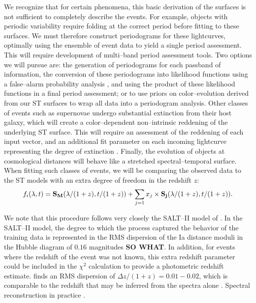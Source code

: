  We recognize that for certain
phenomena, this basic derivation of the surfaces is not sufficient to completely
describe the events. For example, objects with periodic variability require
folding at the correct period before fitting to these surfaces.  We must
therefore construct periodograms for these lightcurves, optimally using the
ensemble of event data to yield a single period assessment.  This will require
development of multi--band period assessment tools.  Two options we will pursue
are: the generation of periodograms for each passband of information, the
conversion of these periodograms into likelihood functions using a false--alarm
probability analysis \citep[e.g.][and references therein]{2009A&A...496..577Z},
and using the product of these likelihood functions in a final period
assessment; or to use priors on color--evolution derived from our ST surfaces to
wrap all data into a periodogram analysis.  Other classes of events such as
supernovae undergo substantial extinction from their host galaxy, which will
create a color--dependent non--intrinsic reddening of the underlying ST surface.
This will require an assessment of the reddening of each input vector, and an
additional fit parameter on each incoming lightcurve representing the degree of
extinction \cite[e.g. Equation 1,][]{2007A&A...466...11G}.  Finally, the
evolution of objects at cosmological distances will behave like a stretched
spectral--temporal surface.  When fitting such classes of events, we will be
comparing the observed data to the ST models with an extra degree of freedom in
the redshift $z$: $$f_i(\lambda, t) = {\bf S_M}(\lambda/(1 + z), t/(1 + z)) +
\sum_{j=1} x_j \times {\bf S_j}(\lambda/(1 + z), t/(1 + z)).$$

 We note that this procedure follows very closely
the SALT--II model of \cite{2007A&A...466...11G}.  In the SALT--II model, the
degree to which the process captured the behavior of the training data is
represented in the RMS dispersion of the Ia distance moduli in the Hubble
diagram of $0.16$ magnitudes {\bf SO WHAT}.  In addition, for events where the
redshift of the event was not known, this extra redshift parameter could be
included in the $\chi^2$ calculation to provide a photometric redshift estimate.
\cite{2007A&A...466...11G} finds an RMS dispersion of $\Delta z/(1 + z) =
0.01-0.02$, which is comparable to the redshift that may be inferred from the
spectra alone \citep[see also][]{2010ApJ...717...40K}. Spectral reconstruction
in practice \citep{2010ApJ...719.1759A}.

